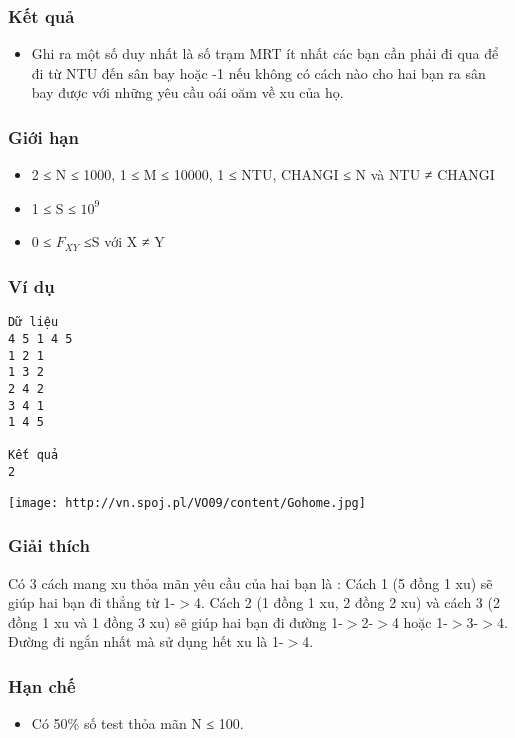 \subsubsection{   Kết quả  }
\begin{itemize}
	\item     Ghi ra một số duy nhất là         số trạm MRT ít nhất        các bạn cần phải đi qua để đi từ NTU đến sân bay hoặc -1 nếu không có cách nào cho hai bạn ra sân bay được với những yêu cầu oái oăm về xu của họ.   
\end{itemize}

\subsubsection{   Giới hạn  }
\begin{itemize}
	\item     2 ≤ N ≤ 1000, 1 ≤ M ≤ 10000, 1 ≤ NTU, CHANGI ≤ N và NTU ≠ CHANGI   
	\item     1 ≤ S ≤ $10^{9}$
	\item     0 ≤ $F_{XY}$    ≤S với X ≠ Y   
\end{itemize}

\subsubsection{   Ví dụ  }
\begin{verbatim}
Dữ liệu
4 5 1 4 5
1 2 1
1 3 2
2 4 2
3 4 1
1 4 5	

Kết quả
2
\end{verbatim}
\texttt{[image: http://vn.spoj.pl/VO09/content/Gohome.jpg]}

\subsubsection{   Giải thích  }

   Có 3 cách mang xu thỏa mãn yêu cầu của hai bạn là : Cách 1 (5 đồng 1 xu) sẽ giúp hai bạn đi thẳng từ 1-$>$4. Cách 2 (1 đồng 1 xu, 2 đồng 2 xu) và cách 3 (2 đồng 1 xu và 1 đồng 3 xu) sẽ giúp hai bạn đi đường 1-$>$2-$>$4 hoặc 1-$>$3-$>$4. Đường đi ngắn nhất mà sử dụng hết xu là 1-$>$4.  

\subsubsection{   Hạn chế  }
\begin{itemize}
	\item     Có 50\% số test thỏa mãn N ≤ 100.   
\end{itemize}
